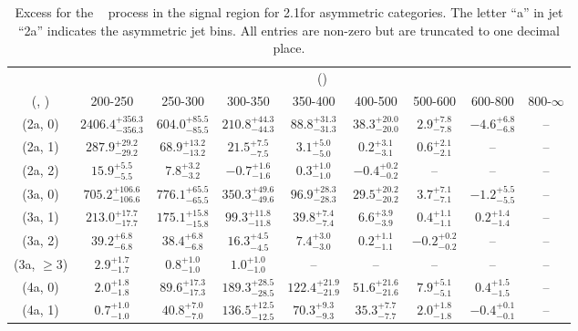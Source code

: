 \begin{table}[h!]
\tiny
\centering
\caption{Excess for the \zInv~ process in the signal region for 2.1\ifb for asymmetric categories. The letter ``a'' in jet \eg ``2a''  indicates the asymmetric jet bins. All entries are non-zero but are truncated to one decimal place.\label{tab:excesssep_sig_zinv_asym}}
\begin{tabular}
{ccccccccc}
	\hline\hline
	& \multicolumn{8}{c}{\scalht (\gev)} \\ 
	 (\njet,  \nb) & 200-250 & 250-300 & 300-350 & 350-400 & 400-500 & 500-600 & 600-800 & 800-$\infty$ \\ [0.8ex] 
\hline
	(2a, 0) & $2406.4^{+ 356.3 }_{- 356.3 }$ & $604.0^{+ 85.5 }_{- 85.5 }$ & $210.8^{+ 44.3 }_{- 44.3 }$ & $88.8^{+ 31.3 }_{- 31.3 }$ & $38.3^{+ 20.0 }_{- 20.0 }$ & $2.9^{+ 7.8 }_{- 7.8 }$ & $-4.6^{+ 6.8 }_{- 6.8 }$ & -- \\[0.5ex] 
	(2a, 1) & $287.9^{+ 29.2 }_{- 29.2 }$ & $68.9^{+ 13.2 }_{- 13.2 }$ & $21.5^{+ 7.5 }_{- 7.5 }$ & $3.1^{+ 5.0 }_{- 5.0 }$ & $0.2^{+ 3.1 }_{- 3.1 }$ & $0.6^{+ 2.1 }_{- 2.1 }$ & -- & -- \\[0.5ex] 
	(2a, 2) & $15.9^{+ 5.5 }_{- 5.5 }$ & $7.8^{+ 3.2 }_{- 3.2 }$ & $-0.7^{+ 1.6 }_{- 1.6 }$ & $0.3^{+ 1.0 }_{- 1.0 }$ & $-0.4^{+ 0.2 }_{- 0.2 }$ & -- & -- & -- \\[0.5ex] 
	(3a, 0) & $705.2^{+ 106.6 }_{- 106.6 }$ & $776.1^{+ 65.5 }_{- 65.5 }$ & $350.3^{+ 49.6 }_{- 49.6 }$ & $96.9^{+ 28.3 }_{- 28.3 }$ & $29.5^{+ 20.2 }_{- 20.2 }$ & $3.7^{+ 7.1 }_{- 7.1 }$ & $-1.2^{+ 5.5 }_{- 5.5 }$ & -- \\[0.5ex] 
	(3a, 1) & $213.0^{+ 17.7 }_{- 17.7 }$ & $175.1^{+ 15.8 }_{- 15.8 }$ & $99.3^{+ 11.8 }_{- 11.8 }$ & $39.8^{+ 7.4 }_{- 7.4 }$ & $6.6^{+ 3.9 }_{- 3.9 }$ & $0.4^{+ 1.1 }_{- 1.1 }$ & $0.2^{+ 1.4 }_{- 1.4 }$ & -- \\[0.5ex] 
	(3a, 2) & $39.2^{+ 6.8 }_{- 6.8 }$ & $38.4^{+ 6.8 }_{- 6.8 }$ & $16.3^{+ 4.5 }_{- 4.5 }$ & $7.4^{+ 3.0 }_{- 3.0 }$ & $0.2^{+ 1.1 }_{- 1.1 }$ & $-0.2^{+ 0.2 }_{- 0.2 }$ & -- & -- \\[0.5ex] 
	(3a, $\ge3$) & $2.9^{+ 1.7 }_{- 1.7 }$ & $0.8^{+ 1.0 }_{- 1.0 }$ & $1.0^{+ 1.0 }_{- 1.0 }$ & -- & -- & -- & -- & -- \\[0.5ex] 
	(4a, 0) & $2.0^{+ 1.8 }_{- 1.8 }$ & $89.6^{+ 17.3 }_{- 17.3 }$ & $189.3^{+ 28.5 }_{- 28.5 }$ & $122.4^{+ 21.9 }_{- 21.9 }$ & $51.6^{+ 21.6 }_{- 21.6 }$ & $7.9^{+ 5.1 }_{- 5.1 }$ & $0.4^{+ 1.5 }_{- 1.5 }$ & -- \\[0.5ex] 
	(4a, 1) & $0.7^{+ 1.0 }_{- 1.0 }$ & $40.8^{+ 7.0 }_{- 7.0 }$ & $136.5^{+ 12.5 }_{- 12.5 }$ & $70.3^{+ 9.3 }_{- 9.3 }$ & $35.3^{+ 7.7 }_{- 7.7 }$ & $2.0^{+ 1.8 }_{- 1.8 }$ & $-0.4^{+ 0.1 }_{- 0.1 }$ & -- \\[0.5ex] 

\end{tabular}
\end{table}
